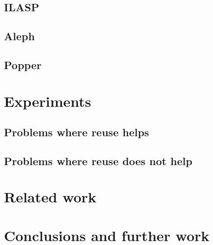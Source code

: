 \documentclass{article}
\begin{document}
\subsection{ILASP}
\subsection{Aleph}
\subsection{Popper}

\section{Experiments}
\subsection{Problems where reuse helps}
\subsection{Problems where reuse does not help}

\section{Related work}

\section{Conclusions and further work}








\end{document}
